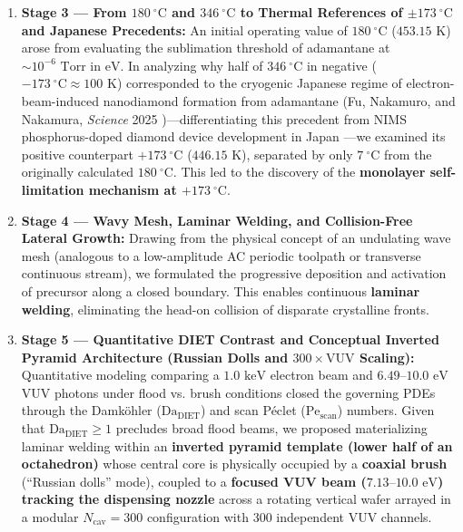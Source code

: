 \documentclass[10pt,twocolumn,a4paper]{article}
\begin{document}
\begin{enumerate}
    \item \textbf{Stage 3 --- From $180\ ^\circ\text{C}$ and $346\ ^\circ\text{C}$ to Thermal References of $\pm 173\ ^\circ\text{C}$ and Japanese Precedents:} An initial operating value of $180\ ^\circ\text{C}$ ($453.15\text{ K}$) arose from evaluating the sublimation threshold of adamantane at $\sim 10^{-6}\text{ Torr}$ in $\text{eV}$. In analyzing why half of $346\ ^\circ\text{C}$ in negative ($-173\ ^\circ\text{C} \approx 100\text{ K}$) corresponded to the cryogenic Japanese regime of electron-beam-induced nanodiamond formation from adamantane (Fu, Nakamuro, and Nakamura, \textit{Science} 2025 \cite{Fu2025})---differentiating this precedent from NIMS phosphorus-doped diamond device development in Japan \cite{Koizumi2001}---we examined its positive counterpart $+173\ ^\circ\text{C}$ ($446.15\text{ K}$), separated by only $7\ ^\circ\text{C}$ from the originally calculated $180\ ^\circ\text{C}$. This led to the discovery of the \textbf{monolayer self-limitation mechanism at $+173\ ^\circ\text{C}$}.
    \item \textbf{Stage 4 --- Wavy Mesh, Laminar Welding, and Collision-Free Lateral Growth:} Drawing from the physical concept of an undulating wave mesh (analogous to a low-amplitude AC periodic toolpath or transverse continuous stream), we formulated the progressive deposition and activation of precursor along a closed boundary. This enables continuous \textbf{laminar welding}, eliminating the head-on collision of disparate crystalline fronts.
    \item \textbf{Stage 5 --- Quantitative DIET Contrast and Conceptual Inverted Pyramid Architecture (Russian Dolls and $300\times\text{VUV}$ Scaling):} Quantitative modeling comparing a $1.0\text{ keV}$ electron beam and $6.49\text{--}10.0\text{ eV}$ VUV photons under flood vs. brush conditions closed the governing PDEs through the Damköhler ($\text{Da}_{\text{DIET}}$) and scan Péclet ($\text{Pe}_{\text{scan}}$) numbers. Given that $\text{Da}_{\text{DIET}} \ge 1$ precludes broad flood beams, we proposed materializing laminar welding within an \textbf{inverted pyramid template (lower half of an octahedron)} whose central core is physically occupied by a \textbf{coaxial brush} (``Russian dolls'' mode), coupled to a \textbf{focused VUV beam ($7.13\text{--}10.0\text{ eV}$) tracking the dispensing nozzle} across a rotating vertical wafer arrayed in a modular $N_{\text{cav}} = 300$ configuration with $300$ independent VUV channels.
\end{enumerate}
\end{document}
